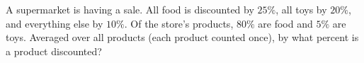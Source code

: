 A supermarket is having a sale. All food is discounted by $25\%$, all toys by $20\%$, and everything else by $10\%$. Of the store's products, $80\%$ are food and $5\%$ are toys. Averaged over all products (each product counted once), by what percent is a product discounted?
